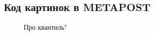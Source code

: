 \documentclass[12pt,a4paper]{article}
\begin{document}
\subsection{ Код картинок в METAPOST}

\begin{figure}[h]
\caption{Про квантиль"}
\label{fig:image}
\end{figure}
\end{document}
